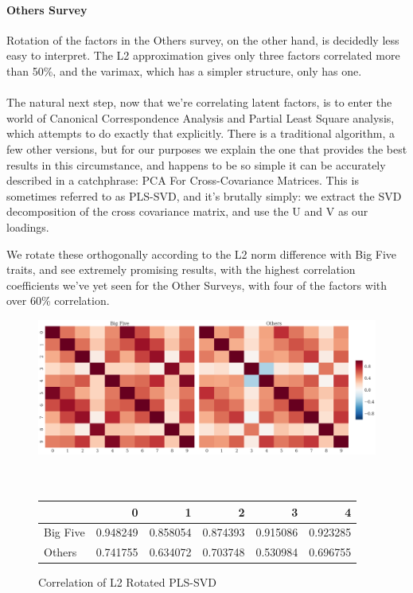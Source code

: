 \documentclass[a4paper,12pt]{article}
\begin{document}
\paragraph{Others Survey}
Rotation of the factors in the Others survey, on the other hand, is decidedly less easy to interpret. The L2 approximation gives only three factors correlated more than 50\%, and the varimax, which has a simpler structure, only has one.
\\
\\
The natural next step, now that we're correlating latent factors, is to enter the world of Canonical Correspondence Analysis and Partial Least Square analysis, which attempts to do exactly that explicitly. There is a traditional algorithm, a few other versions, but for our purposes we explain the one that provides the best results in this circumstance, and happens to be so simple it can be accurately described in a catchphrase: PCA For Cross-Covariance Matrices. This is sometimes referred to as PLS-SVD, and it's brutally simply: we extract the SVD decomposition of the cross covariance matrix, and use the U and V as our loadings.

We rotate these orthogonally according to the L2 norm difference with Big Five traits, and see extremely promising results, with the highest correlation coefficients we've yet seen for the Other Surveys, with four of the factors with over 60\% correlation.

\begin{figure}
\includegraphics[width=\linewidth]{images/cross_svd.png}
\\
\\
\\
\begin{tabular}{lrrrrr}
\toprule
{} &         0 &         1 &         2 &         3 &         4 \\
\midrule
Big Five &  0.948249 &  0.858054 &  0.874393 &  0.915086 &  0.923285 \\
Others   &  0.741755 &  0.634072 &  0.703748 &  0.530984 &  0.696755 \\
\bottomrule
\end{tabular}
\caption{Correlation of L2 Rotated PLS-SVD}\label{fig:pls-svd}
\end{figure}
\end{document}
